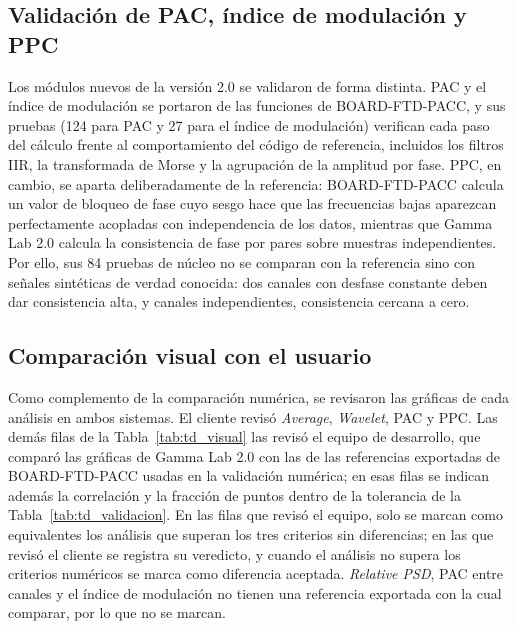 \documentclass[12pt,letterpaper,oneside]{article}
\DeclareRobustCommand{\_}{\textunderscore\allowbreak}
\begin{document}
\subsection{Validación de PAC, índice de modulación y PPC}
Los módulos nuevos de la versión 2.0 se validaron de forma distinta. PAC y el índice de modulación se portaron de las funciones de BOARD-FTD-PACC, y sus pruebas (124 para PAC y 27 para el índice de modulación) verifican cada paso del cálculo frente al comportamiento del código de referencia, incluidos los filtros IIR, la transformada de Morse y la agrupación de la amplitud por fase. PPC, en cambio, se aparta deliberadamente de la referencia: BOARD-FTD-PACC calcula un valor de bloqueo de fase cuyo sesgo hace que las frecuencias bajas aparezcan perfectamente acopladas con independencia de los datos, mientras que Gamma Lab 2.0 calcula la consistencia de fase por pares sobre muestras independientes. Por ello, sus 84 pruebas de núcleo no se comparan con la referencia sino con señales sintéticas de verdad conocida: dos canales con desfase constante deben dar consistencia alta, y canales independientes, consistencia cercana a cero.

\subsection{Comparación visual con el usuario}
Como complemento de la comparación numérica, se revisaron las gráficas de cada análisis en ambos sistemas. El cliente revisó \textit{Average}, \textit{Wavelet}, PAC y PPC. Las demás filas de la Tabla~\ref{tab:td_visual} las revisó el equipo de desarrollo, que comparó las gráficas de Gamma Lab 2.0 con las de las referencias exportadas de BOARD-FTD-PACC usadas en la validación numérica; en esas filas se indican además la correlación y la fracción de puntos dentro de la tolerancia de la Tabla~\ref{tab:td_validacion}. En las filas que revisó el equipo, solo se marcan como equivalentes los análisis que superan los tres criterios sin diferencias; en las que revisó el cliente se registra su veredicto, y cuando el análisis no supera los criterios numéricos se marca como diferencia aceptada. \textit{Relative PSD}, PAC entre canales y el índice de modulación no tienen una referencia exportada con la cual comparar, por lo que no se marcan.
\end{document}

